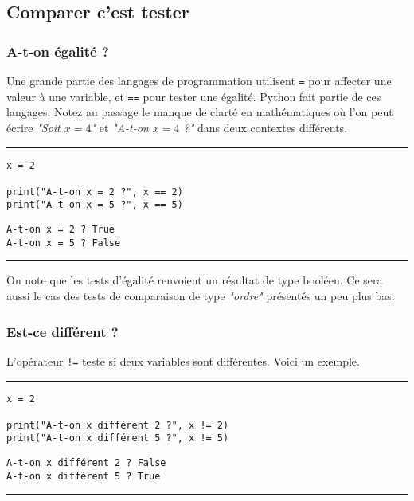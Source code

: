 \subsection{Comparer c'est tester}

\subsubsection{A-t-on égalité ?}

Une grande partie des langages de programmation utilisent \texttt{=} pour affecter une valeur à une variable, et \texttt{==} pour tester une égalité. Python fait partie de ces langages. Notez au passage le manque de clarté en mathématiques où l'on peut écrire \textit{\textit{"Soit $x = 4$"}} et \textit{\textit{"A-t-on $x = 4$ ?"}} dans deux contextes différents.


\bigskip
{\hrule height .5mm}
\begin{verbatim}
x = 2

print("A-t-on x = 2 ?", x == 2)
print("A-t-on x = 5 ?", x == 5)
\end{verbatim}
 \color{ForestGreen}
\vspace{-1.5em}
\begin{verbatim}
A-t-on x = 2 ? True
A-t-on x = 5 ? False
\end{verbatim} \color{Black}
{\hrule height .5mm}
\bigskip


On note que les tests d'égalité renvoient un résultat de type booléen. Ce sera aussi le cas des tests de comparaison de type \textit{"ordre"} présentés un peu plus bas.


\subsubsection{Est-ce différent ?}

L'opérateur \texttt{!=} teste si deux variables sont différentes. Voici un exemple.


\bigskip
{\hrule height .5mm}
\begin{verbatim}
x = 2

print("A-t-on x différent 2 ?", x != 2)
print("A-t-on x différent 5 ?", x != 5)
\end{verbatim}
 \color{ForestGreen}
\vspace{-1.5em}
\begin{verbatim}
A-t-on x différent 2 ? False
A-t-on x différent 5 ? True
\end{verbatim} \color{Black}
{\hrule height .5mm}
\bigskip


